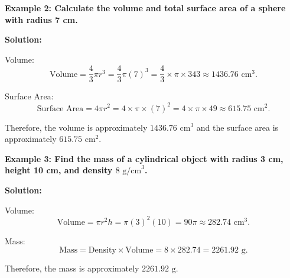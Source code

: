 \begin{flushleft}
	\textbf{Example 2: Calculate the volume and total surface area of a sphere with radius 7 cm.}
	
	\vspace{0.5cm}
	\textbf{Solution:}
	\vspace{0.5cm}
	
	Volume:
	\[
	\text{Volume} = \frac{4}{3}\pi r^3 = \frac{4}{3}\pi (7)^3 = \frac{4}{3} \times \pi \times 343 \approx 1436.76 \text{ cm}^3.
	\]
	
	Surface Area:
	\[
	\text{Surface Area} = 4\pi r^2 = 4 \times \pi \times (7)^2 = 4 \times \pi \times 49 \approx 615.75 \text{ cm}^2.
	\]
	
	Therefore, the volume is approximately $1436.76 \text{ cm}^3$ and the surface area is approximately $615.75 \text{ cm}^2$.
\end{flushleft}

\begin{flushleft}
	\textbf{Example 3: Find the mass of a cylindrical object with radius 3 cm, height 10 cm, and density $8 \text{ g/cm}^3$.}
	
	\vspace{0.5cm}
	\textbf{Solution:}
	\vspace{0.5cm}
	
	Volume:
	\[
	\text{Volume} = \pi r^2 h = \pi (3)^2 (10) = 90\pi \approx 282.74 \text{ cm}^3.
	\]
	
	Mass:
	\[
	\text{Mass} = \text{Density} \times \text{Volume} = 8 \times 282.74 = 2261.92 \text{ g}.
	\]
	
	Therefore, the mass is approximately $2261.92 \text{ g}$.
\end{flushleft}

